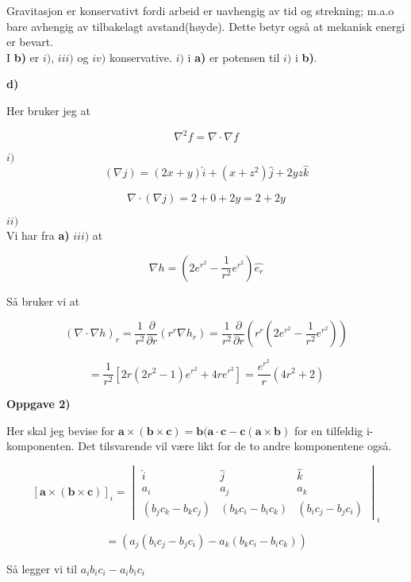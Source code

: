 \documentclass[a4paper,norsk,11pt,twoside]{article}
\begin{document}
Gravitasjon er konservativt fordi arbeid er uavhengig av tid og strekning; m.a.o bare avhengig av tilbakelagt avstand(høyde). Dette betyr også at mekanisk energi er bevart.\\

I \textbf{b)} er $i)$, $iii)$ og $iv)$ konservative. $i)$ i \textbf{a)} er potensen til $i)$ i \textbf{b)}.

\textbf{d)}

Her bruker jeg at

\begin{equation}
\nabla ^{2}f = \nabla \cdot \nabla f 
\end{equation}

$i)$\\

$$
(\nabla j) = (2x + y)\hat{i} + (x + z^2)\hat{j} + 2yz\hat{k}
$$

$$
\nabla \cdot(\nabla j) = 2 + 0 + 2y = 2 + 2y
$$

$ii)$\\

Vi har fra \textbf{a)} $iii)$ at

$$
\nabla h = (2e^{r^{2}} - \frac{1}{r^{2}}e^{r^{2}})\hat{e_r}
$$

Så bruker vi at

$$
(\nabla \cdot \nabla h)_r = \frac{1}{r^{2}}\frac{\partial}{\partial r}(r^{r} \nabla h_r) = \frac{1}{r^{2}}\frac{\partial}{\partial r}(r^{r} (2e^{r^{2}} - \frac{1}{r^{2}}e^{r^{2}}))
$$

$$
= \frac{1}{r^{2}}[2r(2r^{2} - 1)e^{r^{2}} + 4re^{r^{2}}] = \frac{e^{r^{2}}}{r}(4r^{2} + 2)
$$


\textbf{Oppgave 2)}

Her skal jeg bevise for $\textbf{a} \times (\textbf{b} \times \textbf{c} ) = \textbf{b}(\textbf{a} \cdot \textbf{c} - \textbf{c}(\textbf{a} \times \textbf{b}) $ for en tilfeldig i-komponenten. Det tilsvarende vil være likt for de to andre komponentene også.

$$
[\textbf{a} \times (\textbf{b} \times \textbf{c} )]_i 
=\begin{vmatrix}
\hat i & \hat j & \hat k \\
{a_i} & {a_j} & {a_k} \\
(b_j c_k - b_k c_j) & (b_k c_i - b_i c_k) & (b_i c_j - b_j c_i)
\end{vmatrix} _i
$$

$$
= (a_j(b_i c_j - b_j c_i) - a_k(b_k c_i - b_i c_k))
$$

Så legger vi til $a_ib_ic_i - a_ib_ic_i $
\end{document}
